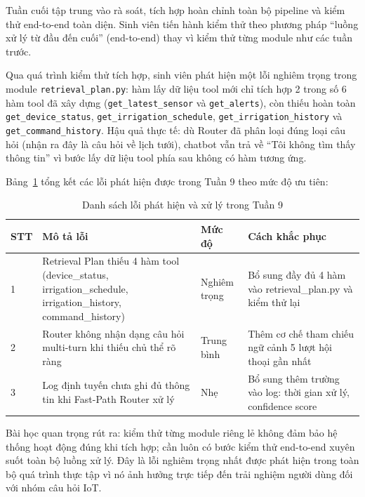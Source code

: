 Tuần cuối tập trung vào rà soát, tích hợp hoàn chỉnh toàn bộ pipeline và kiểm thử end-to-end toàn diện. Sinh viên tiến hành kiểm thử theo phương pháp ``luồng xử lý từ đầu đến cuối'' (end-to-end) thay vì kiểm thử từng module như các tuần trước.

Qua quá trình kiểm thử tích hợp, sinh viên phát hiện một lỗi nghiêm trọng trong module \texttt{retrieval\_plan.py}: hàm lấy dữ liệu tool mới chỉ tích hợp 2 trong số 6 hàm tool đã xây dựng (\texttt{get\_latest\_sensor} và \texttt{get\_alerts}), còn thiếu hoàn toàn \texttt{get\_device\_status}, \texttt{get\_irrigation\_schedule}, \texttt{get\_irrigation\_history} và \texttt{get\_command\_history}. Hậu quả thực tế: dù Router đã phân loại đúng loại câu hỏi (nhận ra đây là câu hỏi về lịch tưới), chatbot vẫn trả về ``Tôi không tìm thấy thông tin'' vì bước lấy dữ liệu tool phía sau không có hàm tương ứng.

Bảng~\ref{tab:loi-he-thong} tổng kết các lỗi phát hiện được trong Tuần 9 theo mức độ ưu tiên:

\begin{table}[H]
\caption{Danh sách lỗi phát hiện và xử lý trong Tuần 9}
\label{tab:loi-he-thong}
\centering
\begin{tabular}{|p{0.8cm}|p{4cm}|p{4cm}|p{4cm}|}
\hline
\textbf{STT} & \textbf{Mô tả lỗi} & \textbf{Mức độ} & \textbf{Cách khắc phục} \\
\hline
1 & Retrieval Plan thiếu 4 hàm tool (device\_status, irrigation\_schedule, irrigation\_history, command\_history) & Nghiêm trọng & Bổ sung đầy đủ 4 hàm vào retrieval\_plan.py và kiểm thử lại \\
\hline
2 & Router không nhận dạng câu hỏi multi-turn khi thiếu chủ thể rõ ràng & Trung bình & Thêm cơ chế tham chiếu ngữ cảnh 5 lượt hội thoại gần nhất \\
\hline
3 & Log định tuyến chưa ghi đủ thông tin khi Fast-Path Router xử lý & Nhẹ & Bổ sung thêm trường vào log: thời gian xử lý, confidence score \\
\hline
\end{tabular}
\end{table}

Bài học quan trọng rút ra: kiểm thử từng module riêng lẻ không đảm bảo hệ thống hoạt động đúng khi tích hợp; cần luôn có bước kiểm thử end-to-end xuyên suốt toàn bộ luồng xử lý. Đây là lỗi nghiêm trọng nhất được phát hiện trong toàn bộ quá trình thực tập vì nó ảnh hưởng trực tiếp đến trải nghiệm người dùng đối với nhóm câu hỏi IoT.

